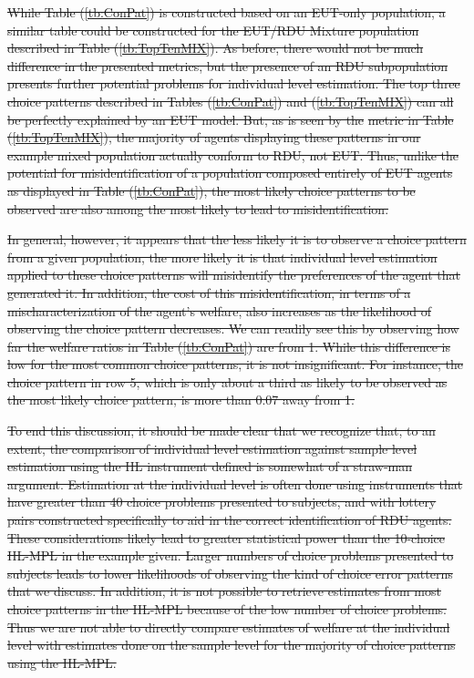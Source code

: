 \documentclass[11pt,a4paper]{report}
\providecommand{\DIFdeltex}[1]{{\protect\color{red}\sout{#1}}}                      %
\providecommand{\DIFdel}[1]{\texorpdfstring{\DIFdeltex{#1}}{}} %
\begin{document}
\DIFdel{While Table (\ref{tb:ConPat}) is constructed based on an EUT-only population, a similar table could be constructed for the EUT/RDU Mixture population described in Table (\ref{tb:TopTenMIX}).
As before, there would not be much difference in the presented metrics, but the presence of an RDU subpopulation presents further potential problems for individual level estimation.
The top three choice patterns described in Tables (\ref{tb:ConPat}) and (\ref{tb:TopTenMIX}) can all be perfectly explained by an EUT model. 
But, as is seen by the }%
\DIFdel{metric in Table (\ref{tb:TopTenMIX}), the majority of agents displaying these patterns in our example mixed population actually conform to RDU, not EUT.
Thus, unlike the potential for misidentification of a population composed entirely of EUT agents as displayed in Table (\ref{tb:ConPat}), the most likely choice patterns to be observed are also among the most likely to lead to misidentification.
}%

\DIFdel{In general, however, it appears that the less likely it is to observe a choice pattern from a given population, the more likely it is that individual level estimation applied to these choice patterns will misidentify the preferences of the agent that generated it.
In addition, the cost of this misidentification, in terms of a mischaracterization of the agent's welfare, also increases as the likelihood of observing the choice pattern decreases.
We can readily see this by observing how far the welfare ratios in Table (\ref{tb:ConPat}) are from 1.
While this difference is low for the most common choice patterns, it is not insignificant.
For instance, the choice pattern in row 5, which is only about a third as likely to be observed as the most likely choice pattern, is more than 0.07 away from 1.
}%

\DIFdel{To end this discussion, it should be made clear that we recognize that, to an extent, the comparison of individual level estimation against sample level estimation using the HL instrument defined is somewhat of a straw-man argument.
Estimation at the individual level is often done using instruments that have greater than 40 choice problems presented to subjects, and with lottery pairs constructed specifically to aid in the correct identification of RDU agents.
These considerations likely lead to greater statistical power than the 10-choice HL-MPL in the example given.
Larger numbers of choice problems presented to subjects leads to lower likelihoods of observing the kind of choice error patterns that we discuss.
In addition, it is not possible to retrieve estimates from most choice patterns in the HL-MPL because of the low number of choice problems.
Thus we are not able to directly compare estimates of welfare at the individual level with estimates done on the sample level for the majority of choice patterns using the HL-MPL.
}%
\end{document}
